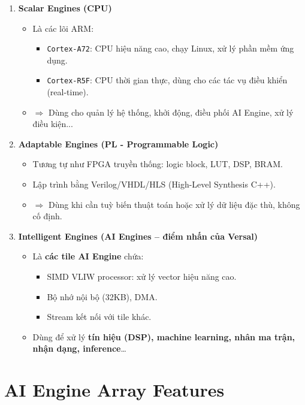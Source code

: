 \begin{enumerate}
    \item \textbf{Scalar Engines (CPU)}
    \begin{itemize}
        \item Là các lõi ARM:
        \begin{itemize}
            \item \texttt{Cortex-A72}: CPU hiệu năng cao, chạy Linux, xử lý phần mềm ứng dụng.
            \item \texttt{Cortex-R5F}: CPU thời gian thực, dùng cho các tác vụ điều khiển (real-time).
        \end{itemize}
        \item $\Rightarrow$ Dùng cho quản lý hệ thống, khởi động, điều phối AI Engine, xử lý điều kiện...
    \end{itemize}

    \item \textbf{Adaptable Engines (PL - Programmable Logic)}
    \begin{itemize}
        \item Tương tự như FPGA truyền thống: logic block, LUT, DSP, BRAM.
        \item Lập trình bằng Verilog/VHDL/HLS (High-Level Synthesis C++).
        \item $\Rightarrow$ Dùng khi cần tuỳ biến thuật toán hoặc xử lý dữ liệu đặc thù, không cố định.
    \end{itemize}

    \item \textbf{Intelligent Engines (AI Engines -- điểm nhấn của Versal)}
    \begin{itemize}
        \item Là \textbf{các tile AI Engine} chứa:
        \begin{itemize}
            \item SIMD VLIW processor: xử lý vector hiệu năng cao.
            \item Bộ nhớ nội bộ (32KB), DMA.
            \item Stream kết nối với tile khác.
        \end{itemize}
        \item Dùng để xử lý \textbf{tín hiệu (DSP), machine learning, nhân ma trận, nhận dạng, inference}\ldots
    \end{itemize}
\end{enumerate}
\section{AI Engine Array Features}

